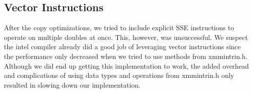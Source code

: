 \subsection{Vector Instructions}
After the copy optimizations, we tried to include explicit SSE instructions to
operate on multiple doubles at once. This, however, was unsuccessful. We
suspect the intel compiler already did a good job of leveraging vector
instructions since the performance only decreased when we tried to use methods
from xmmintrin.h. Although we did end up getting this implementation to work,
the added overhead and complications of using data types and operations from
xmmintrin.h only resulted in slowing down our implementation.
